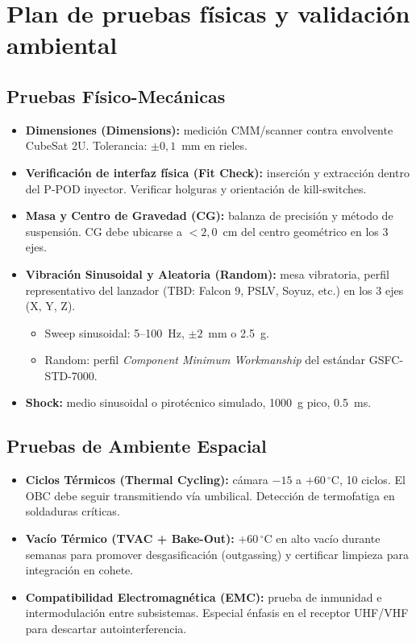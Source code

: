 \section{Plan de pruebas físicas y validación ambiental}

\subsection{Pruebas Físico-Mecánicas}
\begin{itemize}
    \item \textbf{Dimensiones (Dimensions):} medición CMM/scanner contra envolvente CubeSat 2U.
    Tolerancia: $\pm 0{,}1$~mm en rieles.

    \item \textbf{Verificación de interfaz física (Fit Check):} inserción y extracción dentro
    del P-POD inyector. Verificar holguras y orientación de kill-switches.

    \item \textbf{Masa y Centro de Gravedad (CG):} balanza de precisión y método de
    suspensión. CG debe ubicarse a $< 2{,}0$~cm del centro geométrico en los 3 ejes.

    \item \textbf{Vibración Sinusoidal y Aleatoria (Random):} mesa vibratoria, perfil
    representativo del lanzador (TBD: Falcon 9, PSLV, Soyuz, etc.) en los 3 ejes (X, Y, Z).
    \begin{itemize}
        \item Sweep sinusoidal: 5--100~Hz, $\pm 2$~mm o 2.5~g.
        \item Random: perfil \textit{Component Minimum Workmanship} del estándar GSFC-STD-7000.
    \end{itemize}

    \item \textbf{Shock:} medio sinusoidal o pirotécnico simulado, 1000~g pico, 0.5~ms.
\end{itemize}

\subsection{Pruebas de Ambiente Espacial}
\begin{itemize}
    \item \textbf{Ciclos Térmicos (Thermal Cycling):} cámara $-15$ a $+60\,^\circ$C, 10
    ciclos. El OBC debe seguir transmitiendo vía umbilical. Detección de termofatiga
    en soldaduras críticas.

    \item \textbf{Vacío Térmico (TVAC + Bake-Out):} $+60\,^\circ$C en alto vacío durante
    semanas para promover desgasificación (outgassing) y certificar limpieza para
    integración en cohete.

    \item \textbf{Compatibilidad Electromagnética (EMC):} prueba de inmunidad e intermodulación
    entre subsistemas. Especial énfasis en el receptor UHF/VHF para descartar autointerferencia.
\end{itemize}

